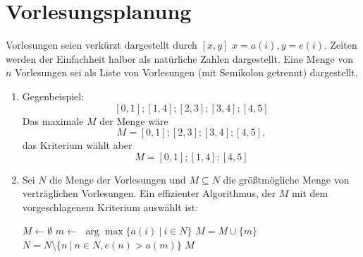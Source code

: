 \documentclass[a4paper,10pt]{article}
\begin{document}
\section{Vorlesungsplanung}
Vorlesungen seien verkürzt dargestellt durch $[x,y]$ $x = a(i), y = e(i)$. Zeiten werden der Einfachheit halber als natürliche Zahlen dargestellt. Eine Menge von $n$ Vorlesungen sei als Liste von Vorlesungen (mit Semikolon getrennt) dargestellt.
\begin{enumerate}
\item   Gegenbeispiel:
        \[[0,1];[1,4];[2,3];[3,4];[4,5]\]
        Das maximale $M$ der Menge wäre 
        \[M = [0,1];[2,3];[3,4];[4,5],\] 
        das Kriterium wählt aber 
        \[M = [0,1];[1,4];[4,5]\]
\item   Sei $N$ die Menge der Vorlesungen und $M \subseteq N$ die größtmögliche Menge von verträglichen Vorlesungen. Ein effizienter Algorithmus, der $M$ mit dem vorgeschlagenem Kriterium auswählt ist:
        \begin{algorithmic}
        \STATE $M \gets \emptyset$
            \STATE $m \gets$ $\arg\max \{a(i)\ |\ i \in N\}$
            \STATE $M = M \cup \{m\}$
            \STATE $N = N \setminus \{n\ |\ n \in N, e(n) > a(m)\}$
        \ENDWHILE
        \RETURN $M$
        \end{algorithmic}

\end{enumerate}
\end{document}
